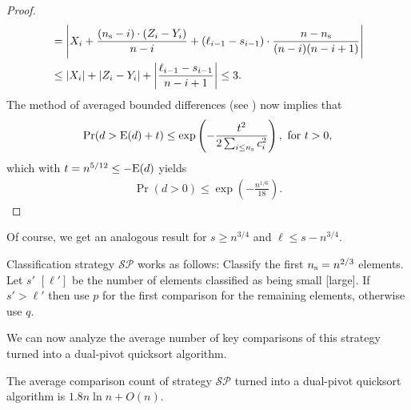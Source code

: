 \documentclass[prodmode,acmtalg]{acmsmall}
\newcommand{\E}{\textnormal{\textrm{E}}}
\newcommand{\Samplesize}{\ensuremath{n_{\textnormal{\textrm{s}}}}}
\begin{document}
\begin{proof}
\begin{align*}
    &= \Bigg|X_i  + \frac{(\Samplesize-i) \cdot (Z_i - Y_i)}{n-i} + (\ell_{i -
    1} - s_{i - 1}) \cdot \frac{n-\Samplesize}{(n-i)(n-i+1)}
    \Bigg|\\
    &\leq \left\vert X_i\right\vert + \left\vert Z_i - Y_i \right \vert +  \left\vert\frac{\ell_{i-1} - s_{i - 1}}{n - i + 1}\right\vert \leq 3.
    \end{align*}
    The method of averaged bounded differences (see
    \cite[Theorem 5.3]{dp09}) now implies that 
    \begin{align*}
	\Pr(d > \E(d) + t) \leq \exp\left(-\frac{t^2}{2\sum_{i \leq
	\Samplesize}c_i^2}\right), \text{ for } t > 0,
    \end{align*}
    which with $t = n^{5/12} \leq -\E(d)$ yields
    \begin{align*}
	\Pr(d > 0) \leq \exp\left(-\frac{n^{1/6}}{18}\right).\tag*{\qed}
    \end{align*}
\end{proof}
Of course, we get an analogous result for $s \geq n^{3/4}$ and $\ell \leq s - n^{3/4}$.

Classification strategy $\mathcal{SP}$ works as follows: Classify the first 
$\Samplesize = n^{2/3}$ elements. Let $s'$ $[\ell']$ be the number of elements classified as being 
small [large].
If $s' > \ell'$ then use $p$ for
the first comparison for the remaining elements, otherwise use $q$.

We can now analyze the average number of key comparisons of this strategy turned
into a dual-pivot quicksort algorithm. 
\begin{theorem}
    The average comparison count
    of strategy $\mathcal{SP}$ turned into a dual-pivot quicksort algorithm is $
    1.8  n\ln n + O(n)$.
\end{theorem}
\end{document}
